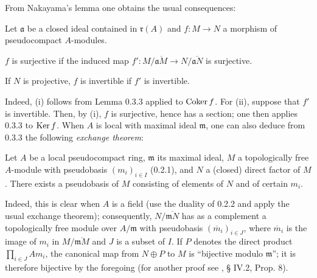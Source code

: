 From Nakayama's lemma one obtains the usual consequences:
\begin{corollary}{}
Let $\mathfrak a$ be a closed ideal contained in $\mathfrak r(A)$ and $f:M\to N$ a morphism of pseudocompact $A$-modules.
\begin{enumeratei}
\item $f$ is surjective if the induced map $f':M/\overline{\mathfrak aM}\to N/\overline{\mathfrak aN}$ is surjective.
\item If $N$ is projective, $f$ is invertible if $f'$ is invertible.
\end{enumeratei}
\end{corollary}
Indeed, (i) follows from Lemma 0.3.3 applied to $\operatorname{Coker} f$. For (ii), suppose that $f'$ is invertible. Then, by (i), $f$ is surjective, hence has a section; one then applies 0.3.3 to $\operatorname{Ker} f$.
When $A$ is local with maximal ideal $\mathfrak m$, one can also deduce from 0.3.3 the following \emph{exchange theorem}:
\begin{theorem}{}
Let $A$ be a local pseudocompact ring, $\mathfrak m$ its maximal ideal, $M$ a topologically free $A$-module with pseudobasis $(m_i)_{i\in I}$ (0.2.1), and $N$ a (closed) direct factor of $M$. There exists a pseudobasis of $M$ consisting of elements of $N$ and of certain $m_i$.
\end{theorem}
Indeed, this is clear when $A$ is a field (use the duality of 0.2.2 and apply the usual exchange theorem); consequently, $N/\overline{\mathfrak mN}$ has as a complement a topologically free module over $A/\mathfrak m$ with pseudobasis $(\overline m_i)_{i\in J}$, where $\overline m_i$ is the image of $m_i$ in $M/\overline{\mathfrak mM}$ and $J$ is a subset of $I$. If $P$ denotes the direct product $\prod_{i\in J}Am_i$, the canonical map from $N\oplus P$ to $M$ is ``bijective modulo $\mathfrak m$''; it is therefore bijective by the foregoing (for another proof see \cite{CA}, § IV.2, Prop. 8).

